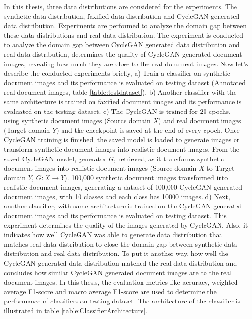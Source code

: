 In this thesis, three data distributions are considered for the experiments. The synthetic data distribution, faxified data distribution and \ac{CycleGAN} generated data distribution. Experiments are performed to analyze the domain gap between these data distributions and real data distribution. The experiment is conducted to analyze the domain gap between \ac{CycleGAN} generated data distribution and real data distribution, determines the quality of \ac{CycleGAN} generated document images, revealing how much they are close to the real document images. Now let's describe the conducted experiments briefly, a) Train a classifier on synthetic document images and its performance is evaluated on testing dataset (Annotated real document images, table \ref{table:testdataset}). b) Another classifier with the same architecture is trained on faxified document images and its performance is evaluated on the testing dataset. c) The \ac{CycleGAN} is trained for 20 epochs, using synthetic document images (Source domain $X$) and real document images (Target domain $Y$) and the checkpoint is saved at the end of every epoch. Once \ac{CycleGAN} training is finished, the saved model is loaded to generate images or transform synthetic document images into realistic document images. From the saved \ac{CycleGAN} model, generator $G$, retrieved, as it transforms synthetic document images into realistic document images (Source domain $X$ to Target domain $Y$, $G: X \rightarrow Y$). 100,000 synthetic document images transformed into realistic document images, generating a dataset of 100,000 \ac{CycleGAN} generated document images, with 10 classes and each class has 10000 images. d) Next, another classifier, with same architecture is trained on the \ac{CycleGAN} generated document images and its performance is evaluated on testing dataset. This experiment determines the quality of the images generated by \ac{CycleGAN}. Also, it indicates how well \ac{CycleGAN} was able to generate data distribution that matches real data distribution to close the domain gap between synthetic data distribution and real data distribution. To put it another way, how well the \ac{CycleGAN} generated data distribution matched the real data distribution and concludes how similar \ac{CycleGAN} generated document images are to the real document images. In this thesis, the evaluation metrics like accuracy, weighted average F1-score and macro average F1-score \cite{lipton2014thresholding} are used to determine the performance of classifiers on testing dataset. The architecture of the classifier is illustrated in table \ref{table:ClassifierArchitecture}.


